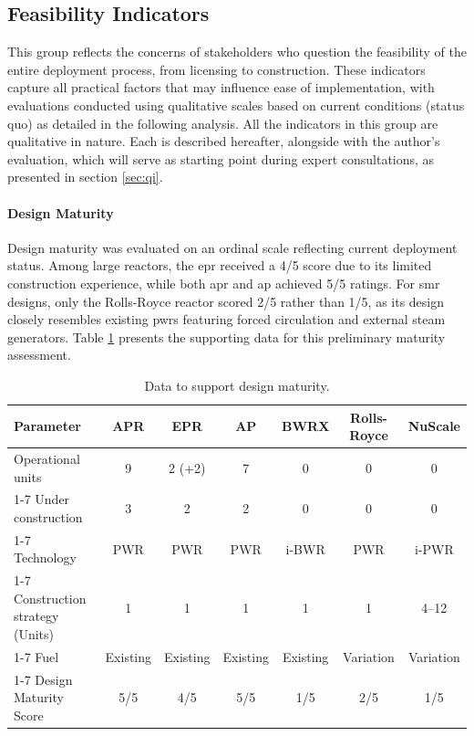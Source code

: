 \subsection{Feasibility Indicators}
This group reflects the concerns of stakeholders who question the feasibility of the entire deployment process, from licensing to construction. These indicators capture all practical factors that may influence ease of implementation, with evaluations conducted using qualitative scales based on current conditions (status quo) as detailed in the following analysis. All the indicators in this group are qualitative in nature. Each is described hereafter, alongside with the author's evaluation, which will serve as starting point during expert consultations, as presented in section \ref{sec:qi}. 

\paragraph{Design Maturity}
Design maturity was evaluated on an ordinal scale reflecting current deployment status. Among large reactors, the \gls{epr} received a 4/5 score due to its limited construction experience, while both \gls{apr} and \gls{ap} achieved 5/5 ratings. For \gls{smr} designs, only the Rolls-Royce reactor scored 2/5 rather than 1/5, as its design closely resembles existing \glspl{pwr} featuring forced circulation and external steam generators. Table \ref{tab:maturity-comparison} presents the supporting data for this preliminary maturity assessment.


\begin{table}[htbp]
    \centering
    \renewcommand{\tabularxcolumn}[1]{m{#1}}
    \begin{tabularx}{\textwidth}{Xcccccc}
        \toprule
        \textbf{Parameter} & \textbf{APR} & \textbf{EPR} & \textbf{AP} & \textbf{BWRX} & \textbf{Rolls-Royce} & \textbf{NuScale} \\
        \midrule
        Operational units & 9 & 2 (+2) & 7 & 0 & 0 & 0 \\
        \cmidrule(lr){1-7}
        Under construction & 3 & 2 & 2 & 0 & 0 & 0 \\
        \cmidrule(lr){1-7}
        Technology & PWR & PWR & PWR & i-BWR & PWR & i-PWR \\
        \cmidrule(lr){1-7}
        Construction strategy (Units) & 1 & 1 & 1 & 1 & 1 & 4–12  \\
        \cmidrule(lr){1-7}
        Fuel & Existing & Existing & Existing & Existing & Variation & Variation \\
        \cmidrule(lr){1-7}
        Design Maturity Score & 5/5 & 4/5 & 5/5 & 1/5 & 2/5 & 1/5 \\
        \bottomrule
    \end{tabularx}
    \caption{Data to support design maturity.}
    \label{tab:maturity-comparison}
\end{table}


